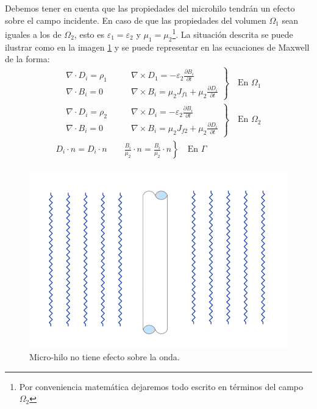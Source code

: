 Debemos tener en cuenta que las propiedades del microhilo tendrán un efecto sobre el campo incidente. En caso de que las propiedades del volumen $\Omega_1$ sean iguales a los de $\Omega_2$, esto es $\varepsilon_1=\varepsilon_2$ y $\mu_1=\mu_2$\footnote{Por conveniencia matemática dejaremos todo escrito en términos del campo $\Omega_2$}. La situación descrita se puede ilustrar como en la imagen \ref{fig:Onda no afectada} y se puede representar en las ecuaciones de Maxwell de la forma:
\begin{equation}
\label{eq:Onda no afectada}
\begin{split}
\left.
\begin{aligned}
&\nabla\cdot D_i = \rho_1\qquad & \nabla\times D_1 = -\varepsilon_2\frac{\partial B_i}{\partial t}\\
&\nabla\cdot B_i = 0\qquad & \nabla\times B_i = \mu_2 J_{f1}+\mu_2\frac{\partial D_i}{\partial t}
\end{aligned}
\right\}
\quad\text{En }\Omega_1\\
\left.
\begin{aligned}
&\nabla\cdot D_i = \rho_2\qquad & \nabla\times D_i = -\varepsilon_2\frac{\partial B_i}{\partial t}\\
&\nabla\cdot B_i = 0\qquad & \nabla\times B_i = \mu_2 J_{f2}+\mu_2\frac{\partial D_i}{\partial t}
\end{aligned}
\right\}
\quad\text{En }\Omega_2\\
\left. 
D_i\cdot n=D_i\cdot n \qquad \frac{B_i}{\mu_2}\cdot n=\frac{B_i}{\mu_2}\cdot n
\right\}
\quad\text{En }\Gamma\\
\end{split}
\end{equation}
\begin{figure}[H]
\centering
\includegraphics[width=16cm]{Imagenes/ondaincidente2.png}
\caption{Micro-hilo no tiene efecto sobre la onda.}\label{fig:Onda no afectada}
\end{figure}
